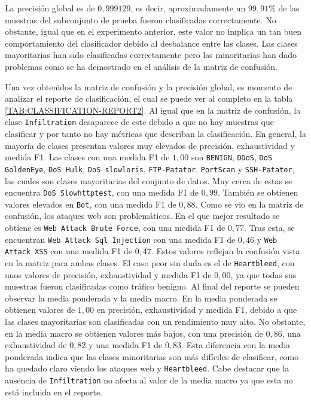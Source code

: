 La precisión global es de $0,999129$, es decir, aproximadamente un $99,91\%$ de las muestras del subconjunto de prueba fueron clasificadas correctamente. No obstante, igual que en el experimento anterior, este valor no implica un tan buen comportamiento del clasificador debido al desbalance entre las clases. Las clases mayoritarias han sido clasificadas correctamente pero las minoritarias han dado problemas como se ha demostrado en el análisis de la matriz de confusión.

Una vez obtenidos la matriz de confusión y la precisión global, es momento de analizar el reporte de clasificación, el cual se puede ver al completo en la tabla \ref{TAB:CLASSIFICATION-REPORT2}. Al igual que en la matriz de confusión, la clase \texttt{Infiltration} desaparece de este debido a que no hay muestras que clasificar y por tanto no hay métricas que describan la clasificación. En general, la mayoría de clases presentan valores muy elevados de precisión, exhaustividad y medida F1. Las clases con una medida F1 de $1,00$ son \texttt{BENIGN}, \texttt{DDoS}, \texttt{DoS GoldenEye}, \texttt{DoS Hulk}, \texttt{DoS slowloris}, \texttt{FTP-Patator}, \texttt{PortScan} y \texttt{SSH-Patator}, las cuales son clases mayoritarias del conjunto de datos. Muy cerca de estas se encuentra \texttt{DoS Slowhttptest}, con una medida F1 de $0,99$. También se obtienen valores elevados en \texttt{Bot}, con una medida F1 de $0,88$. Como se vio en la matriz de confusión, los ataques web son problemáticos. En el que mejor resultado se obtiene es \texttt{Web Attack Brute Force}, con una medida F1 de $0,77$. Tras esta, se encuentran \texttt{Web Attack Sql Injection} con una medida F1 de $0,46$ y \texttt{Web Attack XSS} con una medida F1 de $0,47$. Estos valores reflejan la confusión vista en la matriz para ambas clases. El caso peor sin duda es el de \texttt{Heartbleed}, con unos valores de precisión, exhaustividad y medida F1 de $0,00$, ya que todas sus muestras fueron clasificadas como tráfico benigno.
Al final del reporte se pueden observar la media ponderada y la media macro. En la media ponderada se obtienen valores de $1,00$ en precisión, exhaustividad y medida F1, debido a que las clases mayoritarias son clasificadas con un rendimiento muy alto. No obstante, en la media macro se obtienen valores más bajos, con una precisión de $0,86$, una exhaustividad de $0,82$ y una medida F1 de $0,83$. Esta diferencia con la media ponderada indica que las clases minoritarias son más difíciles de clasificar, como ha quedado claro viendo los ataques web y \texttt{Heartbleed}. Cabe destacar que la ausencia de \texttt{Infiltration} no afecta al valor de la media macro ya que esta no está incluida en el reporte.

